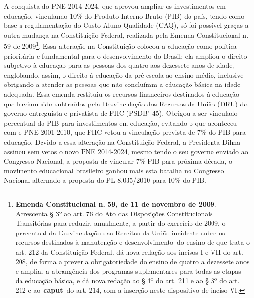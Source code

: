 A conquista do PNE 2014-2024, que aprovou ampliar os investimentos em
educação, vinculando 10\% do Produto Interno Bruto (PIB) do país, tendo
como base a regulamentação do Custo Aluno Qualidade (CAQ), só foi
possível graças a outra mudança na Constituição Federal, realizada pela
Emenda Constitucional n. 59 de 2009\footnote{\textbf{Emenda
  Constitucional n. 59, de 11 de novembro de 2009}. Acrescenta § 3º ao
  art. 76 do Ato das Disposições Constitucionais Transitórias para
  reduzir, anualmente, a partir do exercício de 2009, o percentual da
  Desvinculação das Receitas da União incidente sobre os recursos
  destinados à manutenção e desenvolvimento~do ensino de que trata o
  art. 212 da Constituição Federal, dá nova redação aos incisos I e VII
  do art. 208, de forma a prever a obrigatoriedade do ensino de quatro a
  dezessete anos e ampliar a abrangência dos programas suplementares
  para todas as etapas da educação básica, e dá nova redação ao § 4º do
  art. 211 e ao § 3º do art. 212 e ao~\textbf{caput~}do art. 214, com a
  inserção neste dispositivo de inciso VI.}. Essa alteração na
Constituição colocou a educação como política prioritária e fundamental
para o desenvolvimento do Brasil; ela ampliou o direito subjetivo à
educação para as pessoas dos quatro aos dezessete anos de idade,
englobando, assim, o direito à educação da pré-escola ao ensino médio,
inclusive obrigando a atender as pessoas que não concluíram a educação
básica na idade adequada. Essa emenda restituiu os recursos financeiros
destinados à educação que haviam sido subtraídos pela Desvinculação dos
Recursos da União (DRU) do governo entreguista e privatista de FHC
(PSDB"-45). Obrigou a ser vinculado percentual do PIB para investimentos
em educação, evitando o que aconteceu com o PNE 2001-2010, que FHC vetou
a vinculação prevista de 7\% do PIB para educação. Devido a essa
alteração na Constituição Federal, a Presidenta Dilma assinou sem vetos
o novo PNE 2014-2024, mesmo tendo o seu governo enviado ao Congresso
Nacional, a proposta de vincular 7\% PIB para próxima década, o
movimento educacional brasileiro ganhou mais esta batalha no Congresso
Nacional alternado a proposta do PL 8.035/2010 para 10\% do PIB.

